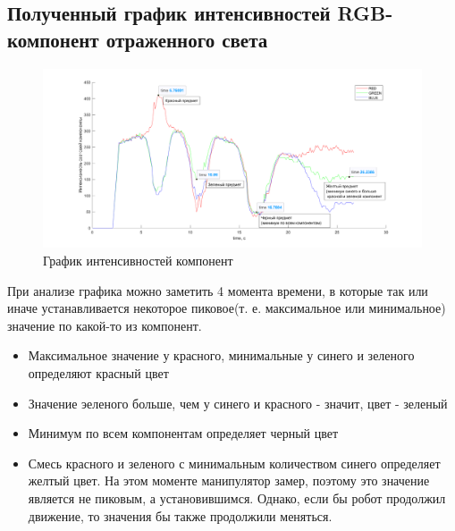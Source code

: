 \documentclass{article}
\begin{document}
\subsection{Полученный график интенсивностей RGB-компонент отраженного света}
\begin{figure}[h]
    \centering
    \includegraphics[width=500 pt]{color_graph.png}
    \caption{График интенсивностей компонент}
\end{figure}

\par При анализе графика можно заметить 4 момента времени, в которые так или иначе устанавливается некоторое пиковое(т. е. максимальное или минимальное) значение по какой-то из компонент.
\begin{itemize}
\item Максимальное значение у красного, минимальные у синего и зеленого определяют красный цвет
\item Значение эеленого больше, чем у синего и красного - значит, цвет - зеленый
\item Минимум по всем компонентам определяет черный цвет
\item Смесь красного и зеленого с минимальным количеством синего определяет желтый цвет. На этом моменте манипулятор замер, поэтому это значение является не пиковым, а установившимся. Однако, если бы робот продолжил движение, то значения бы также продолжили меняться.
\end{itemize}
\end{document}
